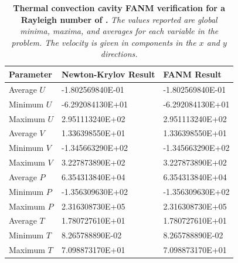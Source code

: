 \begin{table}[h!]
  \begin{center}
    \begin{tabular}{lll}\hline\hline
      \multicolumn{1}{l}{Parameter}& 
      \multicolumn{1}{l}{Newton-Krylov Result}&
      \multicolumn{1}{l}{FANM Result}\\
      \hline
      Average $U$ & -1.802569840E-01 & -1.802569840E-01 \\
      Minimum $U$ & -6.292084130E+01 & -6.292084130E+01 \\
      Maximum $U$ & 2.951113240E+02 & 2.951113240E+02 \\
      \hline
      Average $V$ & 1.336398550E+01 & 1.336398550E+01 \\
      Minimum $V$ & -1.345663290E+02 & -1.345663290E+02 \\
      Maximum $V$ & 3.227873890E+02 & 3.227873890E+02 \\
      \hline
      Average $P$ & 6.354313840E+04 & 6.354313840E+04 \\
      Minimum $P$ & -1.356309630E+02 & -1.356309630E+02 \\
      Maximum $P$ & 2.316308730E+05 & 2.316308730E+05 \\
      \hline
      Average $T$ & 1.780727610E+01 & 1.780727610E+01 \\
      Minimum $T$ & 8.265788890E-02 & 8.265788890E-02 \\
      Maximum $T$ & 7.098873170E+01 & 7.098873170E+01 \\
      \hline\hline
    \end{tabular}
  \end{center}
  \caption{\textbf{Thermal convection cavity FANM verification for a
      Rayleigh number of .} \textit{The values reported are
      global minima, maxima, and averages for each variable in the
      problem. The velocity is given in components in the $x$ and $y$
      directions.}}
  \label{tab:convection_ra1e6_results}
\end{table}

